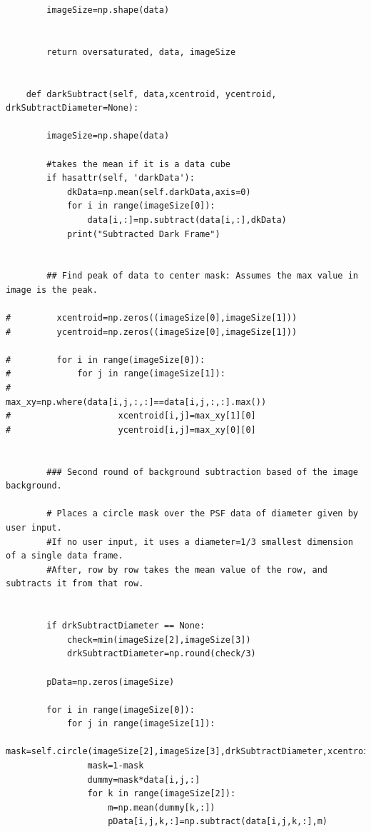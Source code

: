 \begin{lstlisting}
        imageSize=np.shape(data)

            
        return oversaturated, data, imageSize
                           
    
    def darkSubtract(self, data,xcentroid, ycentroid, drkSubtractDiameter=None):
        
        imageSize=np.shape(data)
        
        #takes the mean if it is a data cube
        if hasattr(self, 'darkData'):
            dkData=np.mean(self.darkData,axis=0)
            for i in range(imageSize[0]):
                data[i,:]=np.subtract(data[i,:],dkData)
            print("Subtracted Dark Frame")

        
        ## Find peak of data to center mask: Assumes the max value in image is the peak.

#         xcentroid=np.zeros((imageSize[0],imageSize[1]))
#         ycentroid=np.zeros((imageSize[0],imageSize[1]))
        
#         for i in range(imageSize[0]):
#             for j in range(imageSize[1]):
#                     max_xy=np.where(data[i,j,:,:]==data[i,j,:,:].max())
#                     xcentroid[i,j]=max_xy[1][0]
#                     ycentroid[i,j]=max_xy[0][0]
        
                
        ### Second round of background subtraction based of the image background.
        
        # Places a circle mask over the PSF data of diameter given by user input. 
        #If no user input, it uses a diameter=1/3 smallest dimension of a single data frame. 
        #After, row by row takes the mean value of the row, and subtracts it from that row. 
        
            
        if drkSubtractDiameter == None:
            check=min(imageSize[2],imageSize[3])
            drkSubtractDiameter=np.round(check/3)
        
        pData=np.zeros(imageSize)
        
        for i in range(imageSize[0]):
            for j in range(imageSize[1]):
                mask=self.circle(imageSize[2],imageSize[3],drkSubtractDiameter,xcentroid[i,j],ycentroid[i,j])
                mask=1-mask
                dummy=mask*data[i,j,:]
                for k in range(imageSize[2]):
                    m=np.mean(dummy[k,:])
                    pData[i,j,k,:]=np.subtract(data[i,j,k,:],m)
                    


\end{lstlisting}
